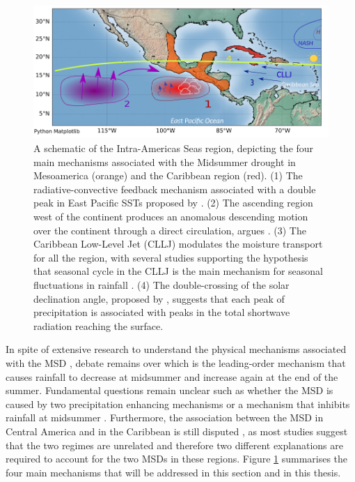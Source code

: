 \begin{figure}[t!]
\includegraphics[width=\linewidth]{figures/back_msd_diag.png}
\caption[Mechanisms of the Midsummer drought]{A schematic of the Intra-Americas Seas region, depicting the four main mechanisms associated with the Midsummer drought in Mesoamerica (orange) and the Caribbean region (red). (1) The radiative-convective feedback mechanism associated with a double peak in East Pacific SSTs proposed by \cite{magana1999}. (2) The ascending region west of the continent produces an anomalous descending motion over the continent through a direct circulation, argues \cite{herrera2015}. (3) The Caribbean Low-Level Jet (CLLJ) modulates the moisture transport for all the region, with several studies supporting the hypothesis that seasonal cycle in the CLLJ is the main mechanism for seasonal fluctuations in rainfall \citep{duranquesada2017,martinez2019}. (4) The double-crossing of the solar declination angle, proposed by \cite{karnauskas2013}, suggests that each peak of precipitation is associated with peaks in the total shortwave radiation reaching the surface.  }
\label{fig:msd_schematic}
\end{figure}

 In spite of extensive research to understand the physical mechanisms associated with the MSD   \citep[e.g.][]{magana1999,giannini2000,gamble2008,herrera2015,maldonado2017,straffon2019}, debate remains over which is the leading-order mechanism that causes rainfall to decrease at midsummer and increase again at the end of the summer.  %
Fundamental questions remain unclear such  as whether the MSD is caused by two precipitation enhancing mechanisms \citep{karnauskas2013} or a mechanism that inhibits rainfall at midsummer \citep{duranquesada2017}. 
Furthermore, the association between the MSD in Central America and in the Caribbean is still disputed \citep{gamble2008}, as most studies suggest that the two regimes are unrelated and therefore two different explanations are required to account for the two MSDs in these regions. 
Figure \ref{fig:msd_schematic} summarises the four main mechanisms that will be addressed in this section and in this thesis. 

